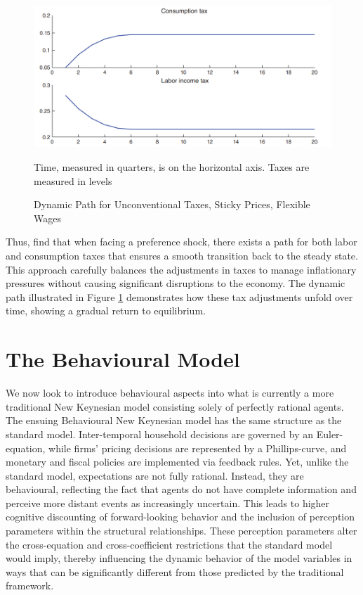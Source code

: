 \documentclass[11pt]{article}
\newcommand{\bb}{\bigbreak\noindent}
\begin{document}
\begin{spacing}{2}
\bb
\begin{figure} [h!]
	\centering
	\includegraphics[width=0.7\linewidth]{images/correia2013}
	\caption{Dynamic Path for Unconventional Taxes, Sticky Prices, Flexible Wages}
	\small{Time, measured in quarters, is on the horizontal axis. Taxes are measured in levels}
	\label{fig:correia2013}
\end{figure}
\bb
Thus, \cite{correia2013unconventional} find that when facing a preference shock, there exists a path for both labor and consumption taxes that ensures a smooth transition back to the steady state. This approach carefully balances the adjustments in taxes to manage inflationary pressures without causing significant disruptions to the economy. The dynamic path illustrated in Figure \ref{fig:correia2013} demonstrates how these tax adjustments unfold over time, showing a gradual return to equilibrium.



\section{The Behavioural Model}
We now look to introduce behavioural aspects into what is currently a more traditional New Keynesian model consisting solely of perfectly rational agents. The ensuing Behavioural New Keynesian model has the same structure as the standard model. Inter-temporal household decisions are governed by an Euler-equation, while firms' pricing decisions are represented by a Phillips-curve, and monetary and fiscal policies are implemented via feedback rules. Yet, unlike the standard model, expectations are not fully rational. Instead, they are behavioural, reflecting the fact that agents do not have complete information and perceive more distant events as increasingly uncertain. This leads to higher cognitive discounting of forward-looking behavior and the inclusion of perception parameters within the structural relationships. These perception parameters alter the cross-equation and cross-coefficient restrictions that the standard model would imply, thereby influencing the dynamic behavior of the model variables in ways that can be significantly different from those predicted by the traditional framework. 


\end{spacing}
\end{document}
